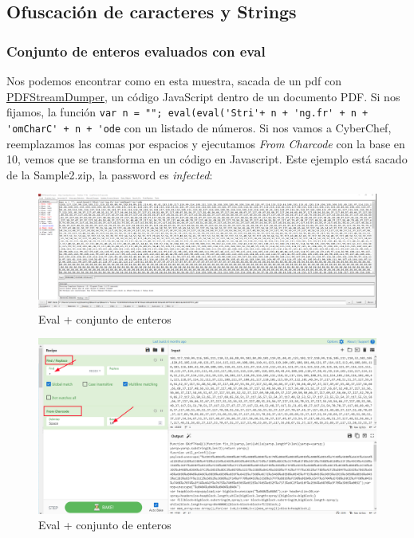 \documentclass[15pt]{article}
\begin{document}
	
	\subsection{Ofuscación de caracteres y Strings}
	\subsubsection{Conjunto de enteros evaluados con eval}
	Nos podemos encontrar como en esta muestra, sacada de un pdf con \href{ [pdfstreamdumper](http://sandsprite.com/blogs/index.php?uid=7&pid=57)}{PDFStreamDumper}, un código JavaScript dentro de un documento PDF. Si nos fijamos, la función \verb*|var n = ""; eval(eval('Stri'+ n + 'ng.fr' + n + 'omCharC' + n + 'ode| con un listado de números. Si nos vamos a CyberChef, reemplazamos las comas por espacios y ejecutamos \textit{From Charcode} con la base en 10, vemos que se transforma en un código en Javascript. Este ejemplo está sacado de la Sample2.zip, la password es \textit{infected}:
	\begin{figure}[H]
		\centering
		\includegraphics[width=18cm]{images/pdf1.png}
		\caption{Eval + conjunto de enteros}
	\end{figure}
	\begin{figure}[H]
		\centering
		\includegraphics[width=15cm]{images/pdf2.png}
		\caption{Eval + conjunto de enteros}
		
	\end{figure}
\end{document}
